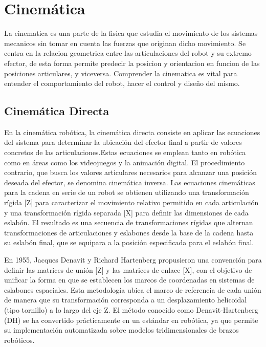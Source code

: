 \section{Cinemática} \label{sec:cinematica}

La cinematica es una parte de la fisica que estudia el movimiento de los sistemas mecanicos sin tomar en cuenta las fuerzas que originan dicho movimiento. Se centra en la relacion geometrica entre las articulaciones del robot y su extremo efector, de esta forma permite predecir la posicion y orientacion en funcion de las posiciones articulares, y viceversa. Comprender la cinematica es vital para entender el comportamiento del robot, hacer el control y diseño del mismo. 

\subsection{Cinemática Directa}
En la cinemática robótica, la cinemática directa consiste en aplicar las ecuaciones del sistema para determinar la ubicación del efector final a partir de valores concretos de las articulaciones.Estas ecuaciones se emplean tanto en robótica como en áreas como los videojuegos y la animación digital. El procedimiento contrario, que busca los valores articulares necesarios para alcanzar una posición deseada del efector, se denomina cinemática inversa.
Las ecuaciones cinemáticas para la cadena en serie de un robot se obtienen utilizando una transformación rígida [Z] para caracterizar el movimiento relativo permitido en cada articulación y una transformación rígida separada [X] para definir las dimensiones de cada eslabón. El resultado es una secuencia de transformaciones rígidas que alternan transformaciones de articulaciones y eslabones desde la base de la cadena hasta su eslabón final, que se equipara a la posición especificada para el eslabón final.

En 1955, Jacques Denavit y Richard Hartenberg propusieron una convención para definir las matrices de unión [Z] y las matrices de enlace [X], con el objetivo de unificar la forma en que se establecen los marcos de coordenadas en sistemas de eslabones espaciales. Esta metodología ubica el marco de referencia de cada unión de manera que su transformación corresponda a un desplazamiento helicoidal (tipo tornillo) a lo largo del eje Z.
El método conocido como Denavit-Hartenberg (DH) se ha convertido prácticamente en un estándar en robótica, ya que permite su implementación automatizada sobre modelos tridimensionales de brazos robóticos.

